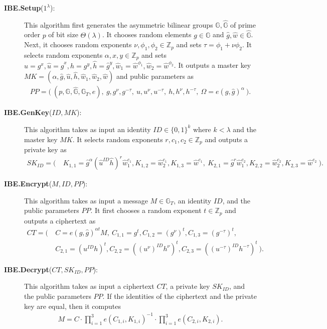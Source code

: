 \documentclass[11pt,letterpaper]{article}
\newcommand{\G}{\mathbb{G}}
\newcommand{\Z}{\mathbb{Z}}
\newcommand{\bits}{\{0,1\}}
\begin{document}
\begin{description}
\item [\textbf{IBE.Setup}($1^\lambda$):] This algorithm first generates the
    asymmetric bilinear groups $\G, \hat{\G}$ of prime order $p$ of bit
    size $\Theta(\lambda)$. It chooses random elements $g \in \G$ and
    $\hat{g}, \hat{w} \in \hat{\G}$. Next, it chooses random exponents
    $\nu, \phi_1, \phi_2 \in \Z_p$ and sets $\tau = \phi_1 + \nu \phi_2$.
    It selects random exponents $\alpha, x, y \in \Z_p$ and sets $u = g^x,
    \hat{u} = \hat{g}^x, h = g^y, \hat{h} = \hat{g}^y, \hat{w}_1 =
    \hat{w}^{\phi_1}, \hat{w}_2 = \hat{w}^{\phi_2}$. It outputs a master
    key $MK = ( \alpha, \hat{g}, \hat{u}, \hat{h}, \hat{w}_1, \hat{w}_2,
    \hat{w})$ and public parameters as
    \begin{align*}
    PP = \Big(~ (p, \G, \hat{\G}, \G_T, e),~
        g, g^{\nu}, g^{-\tau},~ u, u^{\nu}, u^{-\tau},~ h, h^{\nu}, h^{-\tau},~
        \Omega = e(g, \hat{g})^{\alpha}
    ~\Big).
    \end{align*}

\item [\textbf{IBE.GenKey}($ID, MK$):] This algorithm takes as input an
    identity $ID \in \bits^k$ where $k < \lambda$ and the master key $MK$.
    It selects random exponents $r, c_1, c_2 \in \Z_p$ and outputs a
    private key as
    \begin{align*}
    SK_{ID} = \Big(~
    &   K_{1,1} = \hat{g}^{\alpha} (\hat{u}^{ID} \hat{h})^r \hat{w}_1^{c_1},
        K_{1,2} = \hat{w}_2^{c_1},
        K_{1,3} = \hat{w}^{c_1},~
        K_{2,1} = \hat{g}^r \hat{w}_1^{c_2},
        K_{2,2} = \hat{w}_2^{c_2},
        K_{2,3} = \hat{w}^{c_2}
    ~\Big).
    \end{align*}

\item [\textbf{IBE.Encrypt}($M, ID, PP$):] This algorithm takes as input a
    message $M \in \G_T$, an identity $ID$, and the public parameters $PP$.
    It first chooses a random exponent $t \in \Z_p$ and outputs a
    ciphertext as
    \begin{align*}
    CT = \Big(~
    &   C       = e(g, \hat{g})^{\alpha t} M,~
        C_{1,1} = g^t,
        C_{1,2} = (g^{\nu})^t,
        C_{1,3} = (g^{-\tau})^t, \\
    &   C_{2,1} = (u^{ID} h)^t,
        C_{2,2} = ((u^{\nu})^{ID} h^{\nu})^t,
        C_{2,3} = ((u^{-\tau})^{ID} h^{-\tau})^t
    ~\Big).
    \end{align*}

\item [\textbf{IBE.Decrypt}($CT, SK_{ID}, PP$):] This algorithm takes as
    input a ciphertext $CT$, a private key $SK_{ID}$, and the public
    parameters $PP$. If the identities of the ciphertext and the private
    key are equal, then it computes
    \begin{align*}
    M = C \cdot \prod_{i=1}^3 e(C_{1,i}, K_{1,i})^{-1} \cdot
                \prod_{i=1}^3 e(C_{2,i}, K_{2,i}).
    \end{align*}
\end{description}
\end{document}
